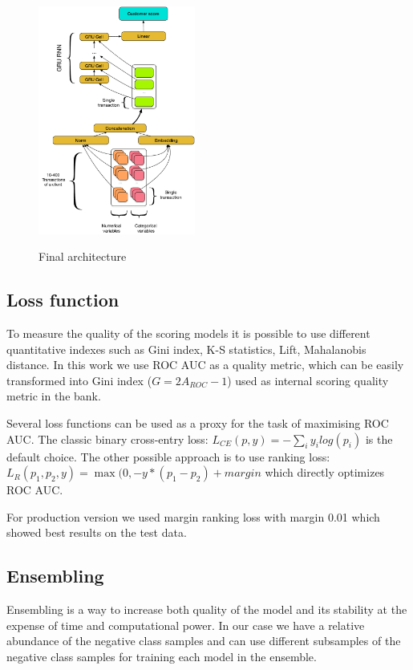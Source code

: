 \documentclass{sigkddExp}
\begin{document}
\begin{figure}[h]
  \caption{Final architecture}
  \includegraphics[width=0.46\textwidth]{architecture.pdf}
  \label{fig-arch}
\end{figure}


\subsection{Loss function}

To measure the quality of the scoring models it is possible to use different quantitative indexes such as Gini index, K-S statistics, Lift, Mahalanobis distance. 
In this work we use ROC AUC as a quality metric, which can be easily transformed into Gini index ($G = 2A_{ROC} - 1$) used as internal scoring quality metric in the bank. 

Several loss functions can be used as a proxy for the task of maximising ROC AUC. The classic binary cross-entry loss: $L_{CE}(p, y) = - \sum_i y_ilog(p_i)$ is the default choice.
The other possible approach is to use ranking loss: $ L_R(p_1, p_2, y) = \max(0, -y * (p_1 - p_2) + margin $ which directly optimizes ROC AUC.

For production version we used margin ranking loss with margin 0.01 which showed best results on the test data. 

\subsection{Ensembling}

Ensembling is a way to increase both quality of the model and its stability at the expense of time and computational power. In our case we have a relative abundance of the negative class samples and can use different subsamples of the negative class samples for training each model in the ensemble. 
\end{document}
